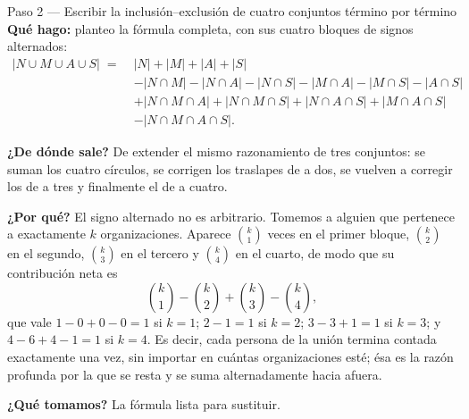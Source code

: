 \documentclass[11pt]{article}
\begin{document}
\begin{paso}{Paso 2 --- Escribir la inclusión--exclusión de cuatro conjuntos término por término}
\textbf{Qué hago:} planteo la fórmula completa, con sus cuatro bloques de signos alternados:
\begin{align*}
|N\cup M\cup A\cup S| \;=\;& |N|+|M|+|A|+|S| \\
&- |N\cap M| - |N\cap A| - |N\cap S| - |M\cap A| - |M\cap S| - |A\cap S| \\
&+ |N\cap M\cap A| + |N\cap M\cap S| + |N\cap A\cap S| + |M\cap A\cap S| \\
&- |N\cap M\cap A\cap S| .
\end{align*}

\textbf{¿De dónde sale?} De extender el mismo razonamiento de tres conjuntos: se suman los cuatro
círculos, se corrigen los traslapes de a dos, se vuelven a corregir los de a tres y finalmente el de a
cuatro.

\textbf{¿Por qué?} El signo alternado no es arbitrario. Tomemos a alguien que pertenece a exactamente $k$
organizaciones. Aparece $\binom{k}{1}$ veces en el primer bloque, $\binom{k}{2}$ en el segundo,
$\binom{k}{3}$ en el tercero y $\binom{k}{4}$ en el cuarto, de modo que su contribución neta es
\[
\binom{k}{1}-\binom{k}{2}+\binom{k}{3}-\binom{k}{4},
\]
que vale $1-0+0-0=1$ si $k=1$; $2-1=1$ si $k=2$; $3-3+1=1$ si $k=3$; y $4-6+4-1=1$ si $k=4$. Es decir,
cada persona de la unión termina contada exactamente una vez, sin importar en cuántas organizaciones
esté; ésa es la razón profunda por la que se resta y se suma alternadamente hacia afuera.

\textbf{¿Qué tomamos?} La fórmula lista para sustituir.
\end{paso}
\end{document}
